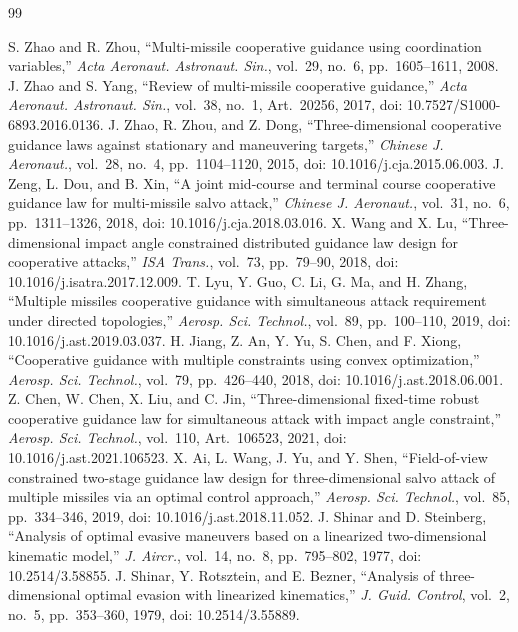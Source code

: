 \documentclass[unbranded]{cja}
\begin{document}
\begin{thebibliography}{99}

S. Zhao and R. Zhou, ``Multi-missile cooperative guidance using coordination variables,'' \textit{Acta Aeronaut. Astronaut. Sin.}, vol.~29, no.~6, pp.~1605--1611, 2008.
J. Zhao and S. Yang, ``Review of multi-missile cooperative guidance,'' \textit{Acta Aeronaut. Astronaut. Sin.}, vol.~38, no.~1, Art.~20256, 2017, doi: 10.7527/S1000-6893.2016.0136.
J. Zhao, R. Zhou, and Z. Dong, ``Three-dimensional cooperative guidance laws against stationary and maneuvering targets,'' \textit{Chinese J. Aeronaut.}, vol.~28, no.~4, pp.~1104--1120, 2015, doi: 10.1016/j.cja.2015.06.003.
J. Zeng, L. Dou, and B. Xin, ``A joint mid-course and terminal course cooperative guidance law for multi-missile salvo attack,'' \textit{Chinese J. Aeronaut.}, vol.~31, no.~6, pp.~1311--1326, 2018, doi: 10.1016/j.cja.2018.03.016.
X. Wang and X. Lu, ``Three-dimensional impact angle constrained distributed guidance law design for cooperative attacks,'' \textit{ISA Trans.}, vol.~73, pp.~79--90, 2018, doi: 10.1016/j.isatra.2017.12.009.
T. Lyu, Y. Guo, C. Li, G. Ma, and H. Zhang, ``Multiple missiles cooperative guidance with simultaneous attack requirement under directed topologies,'' \textit{Aerosp. Sci. Technol.}, vol.~89, pp.~100--110, 2019, doi: 10.1016/j.ast.2019.03.037.
H. Jiang, Z. An, Y. Yu, S. Chen, and F. Xiong, ``Cooperative guidance with multiple constraints using convex optimization,'' \textit{Aerosp. Sci. Technol.}, vol.~79, pp.~426--440, 2018, doi: 10.1016/j.ast.2018.06.001.
Z. Chen, W. Chen, X. Liu, and C. Jin, ``Three-dimensional fixed-time robust cooperative guidance law for simultaneous attack with impact angle constraint,'' \textit{Aerosp. Sci. Technol.}, vol.~110, Art.~106523, 2021, doi: 10.1016/j.ast.2021.106523.
X. Ai, L. Wang, J. Yu, and Y. Shen, ``Field-of-view constrained two-stage guidance law design for three-dimensional salvo attack of multiple missiles via an optimal control approach,'' \textit{Aerosp. Sci. Technol.}, vol.~85, pp.~334--346, 2019, doi: 10.1016/j.ast.2018.11.052.
J. Shinar and D. Steinberg, ``Analysis of optimal evasive maneuvers based on a linearized two-dimensional kinematic model,'' \textit{J. Aircr.}, vol.~14, no.~8, pp.~795--802, 1977, doi: 10.2514/3.58855.
J. Shinar, Y. Rotsztein, and E. Bezner, ``Analysis of three-dimensional optimal evasion with linearized kinematics,'' \textit{J. Guid. Control}, vol.~2, no.~5, pp.~353--360, 1979, doi: 10.2514/3.55889.

\end{thebibliography}
\end{document}
